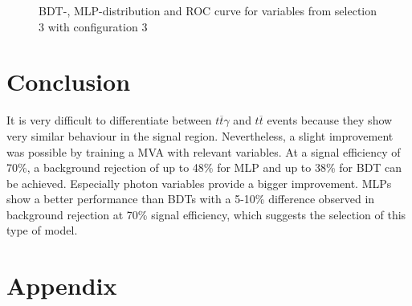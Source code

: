 \documentclass[11pt]{scrartcl}
\begin{document}
\begin{figure}[H]
	\caption{BDT-, MLP-distribution and ROC curve for variables from selection 3 with configuration 3}
	 \label{fig:ROC_s3_config3}	
	\end{figure}
				
\section{Conclusion}
It is very difficult to differentiate between $t\overline{t}\gamma$ and $t\overline{t}$ events because they show very similar behaviour in the signal region. Nevertheless, a slight improvement was possible by training a MVA with relevant variables. At a signal efficiency of 70\%, a background rejection of up to 48\% for MLP and up to 38\% for BDT can be achieved. Especially photon variables provide a bigger improvement. MLPs show a better performance than BDTs with a 5-10\% difference observed in background rejection at 70\% signal efficiency, which suggests the selection of this type of model.

\appendix
\section{Appendix}
\end{document}
